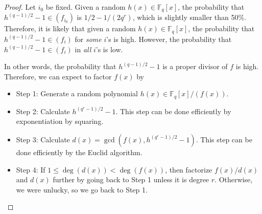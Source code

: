 \documentclass[12pt, psamsfonts]{amsart}
\theoremstyle{definition}
\theoremstyle{remark}
\numberwithin{equation}{section}
\begin{document}
\begin{proof}
  Let $i_0$ be fixed.
  Given a random $h(x) \in \mathbb{F}_q[x]$, the probability that $h^{(q - 1)/2} - 1 \in (f_{i_0})$ is $1/2 - 1/(2q^r)$, which is slightly smaller than 50\%.
  Therefore, it is likely that given a random $h(x) \in \mathbb{F}_q[x]$, the probability that $h^{(q - 1)/2} - 1 \in (f_i)$ for \textit{some} $i$'s is high.
  However, the probability that $h^{(q - 1)/2} - 1 \in (f_i)$ in \textit{all} $i$'s is low.

  In other words, the probability that $h^{(q - 1)/2} - 1$ is a proper divisor of $f$ is high.
  Therefore, we can expect to factor $f(x)$ by 

  \begin{itemize}
    \item
      Step 1: Generate a random polynomial $h(x) \in \mathbb{F}_q[x]/(f(x))$.
    \item
      Step 2: Calculate $h^{(q^r - 1)/2} - 1$.
      This step can be done efficiently by exponentiation by squaring.
    \item
      Step 3: Calculate $d(x) = \gcd(f(x), h^{(q^r - 1)/2} - 1)$.
      This step can be done efficiently by the Euclid algorithm.
    \item
      Step 4: If $1 \leq \deg(d(x)) < \deg(f(x))$, then factorize $f(x)/d(x)$ and $d(x)$ further by going back to Step 1 unless it is degree $r$.
      Otherwise, we were unlucky, so we go back to Step 1.
  \end{itemize}
\end{proof}
\end{document}
